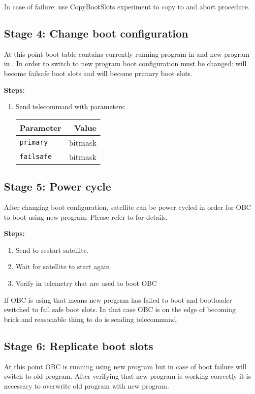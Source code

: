 In case of failure: use CopyBootSlots experiment to copy \currentbs{} to \targetbs{} and abort procedure. 

\subsection{Stage 4: Change boot configuration}
At this point boot table contains currently running program in \currentbs{} and new program in \targetbs{}. In order to switch to new program boot configuration must be changed: \currentbs{} will become failsafe boot slots and \targetbs{} will become primary boot slots.

\textbf{Steps:}
\begin{enumerate}
	\item Send  telecommand with parameters:
	
		\begin{tabular}{l|r}
			Parameter & Value \\
			\hline
			\texttt{primary} & \targetbs{} bitmask \\ 
			\texttt{failsafe} & \currentbs{} bitmask
		\end{tabular}
\end{enumerate}

\subsection{Stage 5: Power cycle}
After changing boot configuration, satellite can be power cycled in order for OBC to boot using new program. Please refer to  for details.

\textbf{Steps:}
\begin{enumerate}
	\item Send  to restart satellite.
	\item Wait for satellite to start again
	\item Verify in telemetry that \targetbs{} are used to boot OBC
\end{enumerate}

If OBC is using \currentbs{} that means new program has failed to boot and bootloader switched to fail safe boot slots. In that case OBC is on the edge of becoming brick and reasonable thing to do is sending  telecommand.

\subsection{Stage 6: Replicate boot slots}
At this point OBC is running using new program but in case of boot failure will switch to old program. After verifying that new program is working correctly it is necessary to overwrite old program with new program.

